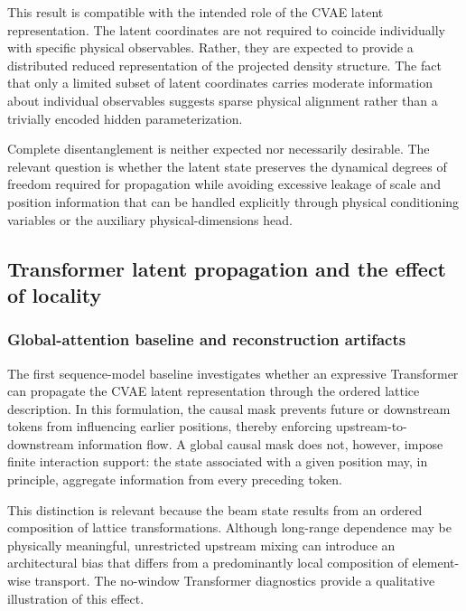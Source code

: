 This result is compatible with the intended role of the CVAE latent representation. The latent coordinates are not required to coincide individually with specific physical observables. Rather, they are expected to provide a distributed reduced representation of the projected density structure. The fact that only a limited subset of latent coordinates carries moderate information about individual observables suggests sparse physical alignment rather than a trivially encoded hidden parameterization.

Complete disentanglement is neither expected nor necessarily desirable. The relevant question is whether the latent state preserves the dynamical degrees of freedom required for propagation while avoiding excessive leakage of scale and position information that can be handled explicitly through physical conditioning variables or the auxiliary physical-dimensions head.

\subsection{Transformer latent propagation and the effect of locality}
\label{subsec:results_transformer_locality}

\subsubsection{Global-attention baseline and reconstruction artifacts}
\label{subsubsec:results_nowindow_transformer}

The first sequence-model baseline investigates whether an expressive Transformer can propagate the CVAE latent representation through the ordered lattice description. In this formulation, the causal mask prevents future or downstream tokens from influencing earlier positions, thereby enforcing upstream-to-downstream information flow. A global causal mask does not, however, impose finite interaction support: the state associated with a given position may, in principle, aggregate information from every preceding token.

This distinction is relevant because the beam state results from an ordered composition of lattice transformations. Although long-range dependence may be physically meaningful, unrestricted upstream mixing can introduce an architectural bias that differs from a predominantly local composition of element-wise transport. The no-window Transformer diagnostics provide a qualitative illustration of this effect.

